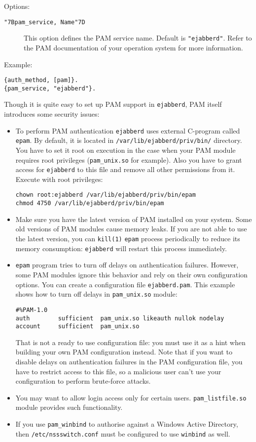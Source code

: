 \documentclass[a4paper,10pt]{book}
\newcommand{\ind}[1]{\begin{latexonly}\index{#1}\end{latexonly}}
\newcommand{\bracehack}{\def\{{\char"7B}\def\}{\char"7D}}
\newcommand{\titem}[1]{\item[\bracehack\texttt{#1}]}
\newcommand{\term}[1]{\texttt{#1}}
\newcommand{\ejabberd}{\texttt{ejabberd}}
\begin{document}
Options:
\begin{description}
\titem{\{pam\_service, Name\}}\ind{options!pam\_service}This option defines the PAM service name.
Default is \term{"ejabberd"}. Refer to the PAM documentation of your operation system
for more information.
\end{description}

Example:
\begin{verbatim}
{auth_method, [pam]}.
{pam_service, "ejabberd"}.
\end{verbatim}

Though it is quite easy to set up PAM support in \ejabberd{}, PAM itself introduces some
security issues:

\begin{itemize}
\item To perform PAM authentication \ejabberd{} uses external C-program called
\term{epam}. By default, it is located in \verb|/var/lib/ejabberd/priv/bin/|
directory. You have to set it root on execution in the case when your PAM module
requires root privileges (\term{pam\_unix.so} for example). Also you have to grant access
for \ejabberd{} to this file and remove all other permissions from it.
Execute with root privileges:
\begin{verbatim}
chown root:ejabberd /var/lib/ejabberd/priv/bin/epam
chmod 4750 /var/lib/ejabberd/priv/bin/epam
\end{verbatim}
\item Make sure you have the latest version of PAM installed on your system.
Some old versions of PAM modules cause memory leaks. If you are not able to use the latest
version, you can \term{kill(1)} \term{epam} process periodically to reduce its memory
consumption: \ejabberd{} will restart this process immediately.
\item \term{epam} program tries to turn off delays on authentication failures.
However, some PAM modules ignore this behavior and rely on their own configuration options.
You can create a configuration file \term{ejabberd.pam}.
This example shows how to turn off delays in \term{pam\_unix.so} module:
\begin{verbatim}
#%PAM-1.0
auth        sufficient  pam_unix.so likeauth nullok nodelay
account     sufficient  pam_unix.so
\end{verbatim}
That is not a ready to use configuration file: you must use it
as a hint when building your own PAM configuration instead. Note that if you want to disable
delays on authentication failures in the PAM configuration file, you have to restrict access
to this file, so a malicious user can't use your configuration to perform brute-force
attacks.
\item You may want to allow login access only for certain users. \term{pam\_listfile.so}
module provides such functionality.
\item If you use \term{pam\_winbind} to authorise against a Windows Active Directory,
then \term{/etc/nssswitch.conf} must be configured to use \term{winbind} as well.
\end{itemize}
\end{document}
